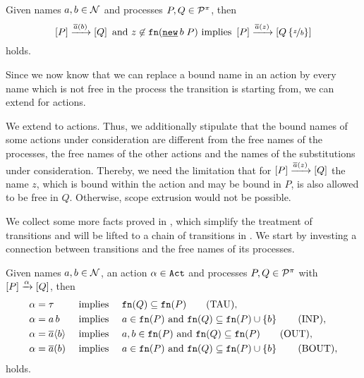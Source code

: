 \begin{lemma}
\label{lem_bn_trans}
Given names $a,b\in\mathcal N$ and processes $P,Q\in\mathcal P^{\pi}$, then
\[\ec{P}\bouttrans{a}{b}\ec{Q} \text{ and } z\nin\fn{\procres{b}{P}} \text{ implies } \ec{P}\bouttrans{a}{z}\ec{Q\subs{z}{b}}\]
holds.
\end{lemma}

Since we now know that we can replace a bound name in an action by every name which is not free in the process the transition is starting from, we can extend  for actions.

\begin{conv}
\label{conv_uni_bn_trans}
We extend  to actions. Thus, we additionally stipulate that the bound names of some actions under consideration are different from the free names of the processes, the free names of the other actions and the names of the substitutions under consideration. Thereby, we need the limitation that for $\left[P\right]\xrightarrow{\overline{a}(z)}\left[Q\right]$ the name $z$, which is bound within the action and may be bound in $P$, is also allowed to be free in $Q$. Otherwise, scope extrusion would not be possible.
\end{conv}

We collect some more facts proved in \cite{sangiorgi}, which simplify the treatment of transitions and will be lifted to a chain of transitions in . We start by investing a connection between transitions and the free names of its processes.

\begin{lemma}
\label{lem_trans_fn}
Given names $a,b\in\mathcal N$, an action $\alpha\in\mathtt{Act}$ and processes $P,Q\in\mathcal P^{\pi}$ with $\left[P\right]\xrightarrow{\alpha}\left[Q\right]$, then
\begin{align}
\alpha=&\;\tau &\text{ implies } &&&\fn{Q}\subseteq\fn{P} \tag{TAU}\label{eq_trans_fn_tau}, \\
\alpha=&\;\inpa{a}{b}&\text{ implies } &&&a\in\fn{P} \text{ and } \fn{Q}\subseteq\fn{P}\cup\set{b} \tag{INP}\label{eq_trans_fn_inp},\\
\alpha=&\;\outa{a}{b} &\text{ implies } &&&a,b\in\fn{P} \text{ and } \fn{Q}\subseteq\fn{P} \tag{OUT}\label{eq_trans_fn_out},\\
\alpha=&\;\bouta{a}{b} &\text{ implies } &&&a\in\fn{P} \text{ and } \fn{Q}\subseteq\fn{P}\cup\set{b} \tag{BOUT}\label{eq_trans_fn_bout},
\end{align}
holds.
\end{lemma}

